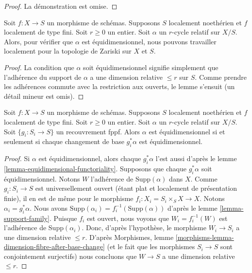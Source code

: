 \begin{proof} La 
démonstration est omise. 
\end{proof} 

\begin{lemma} 
\label{lemma-check-equidimensional} 
Soit  $f : X \to S$  un morphisme de schémas. Supposons  $S$  localement noethérien
 et  $f$  localement de type fini. Soit  $r \geq 0$  un entier. Soit  $\alpha$
  un  $r$-cycle relatif sur  $X/S$. Alors, pour vérifier que  $\alpha$  est équidimensionnel, nous pouvons
 travailler localement pour la topologie de Zariski sur  $X$  et  $S$. 
\end{lemma} 

\begin{proof}
 La condition que  $\alpha$  soit équidimensionnel signifie simplement
 que l'adhérence du support de  $\alpha$  a une dimension relative $\leq r$
  sur  $S$. Comme prendre les adhérences commute avec la restriction aux ouverts,
 le lemme s'ensuit (un détail mineur est omis). 
\end{proof} 

\begin{lemma} 
\label{lemma-equidimensional-fppf-descent} 
Soit  $f : X \to S$  un morphisme de schémas. Supposons  $S$  localement noethérien
 et  $f$  localement de type fini. Soit  $r \geq 0$  un entier. Soit  $\alpha$
  un  $r$-cycle relatif sur  $X/S$. Soit $\{g_i : S_i \to S\}$
  un recouvrement fppf. Alors  $\alpha$  est équidimensionnel si 
et seulement si chaque changement de base  $g_i^*\alpha$  est équidimensionnel. 
\end{lemma} 

\begin{proof} 
Si  $\alpha$  est équidimensionnel, alors chaque  $g_i^*\alpha$  l'est aussi d'après
 le lemme \ref{lemma-equidimensional-functoriality}. Supposons que chaque  $g_i^*\alpha$
  soit équidimensionnel. Notons  $W$  l'adhérence 
de  $\text{Supp}(\alpha)$  dans  $X$. Comme $g_i : S_i \to S$  est universellement ouvert
 (étant plat et localement de présentation finie), il en est de même pour le morphisme  
$f_i : X_i = S_i \times_S X \to X$. Notons  $\alpha_i = g_i^*\alpha$. Nous avons  
$\text{Supp}(\alpha_i) = f_i^{-1}(\text{Supp}(\alpha))$  d'après
 le lemme \ref{lemma-support-family}. 
Puisque  $f_i$  est ouvert, nous voyons que  $W_i = f_i^{-1}(W)$  est l'adhérence 
de  $\text{Supp}(\alpha_i)$. Donc, d'après l'hypothèse, le morphisme  
$W_i \to S_i$  a une dimension relative $\leq r$.
 D'après Morphismes, lemme \ref{morphisms-lemma-dimension-fibre-after-base-change}
 (et le fait que les morphismes $S_i \to S$  sont conjointement surjectifs)
 nous concluons que  $W \to S$  a une dimension relative  $\leq r$. 
\end{proof} 

